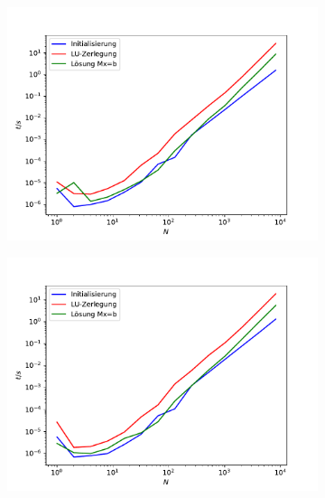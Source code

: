 \documentclass{scrartcl}
\begin{document}
		\begin{figure}[h!]
		\centering
		\begin{subfigure}{0.8\textwidth}
		\includegraphics[width=\textwidth]{A2/build/timers.pdf}
		\end{subfigure}
		\begin{subfigure}{0.4\textwidth}
		\includegraphics[width=\textwidth]{A2/Dann_halt_so/timers_PC.pdf}
		\end{subfigure}
		\begin{subfigure}{0.4\textwidth}

\end{subfigure}
\end{figure}
\end{document}
